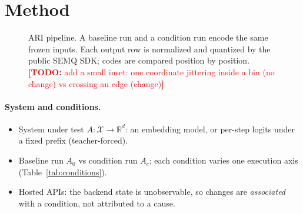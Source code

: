 \documentclass{article}
\newcommand{\todo}[1]{\textcolor{red}{\textbf{[TODO:} #1\textbf{]}}}
\begin{document}
\section{Method}\label{sec:method}

\begin{figure}[t]
\centering
{}
\caption{ARI pipeline. A baseline run and a condition run encode the same frozen inputs. Each output row is normalized and quantized by the public SEMQ SDK; codes are compared position by position. \todo{add a small inset: one coordinate jittering inside a bin (no change) vs crossing an edge (change)}}
\label{fig:pipeline}
\end{figure}

\paragraph{System and conditions.}
\begin{itemize}
  \item System under test $A:\mathcal X\to\mathbb R^d$: an embedding model, or per-step logits under a fixed prefix (teacher-forced).
  \item Baseline run $A_0$ vs condition run $A_c$; each condition varies one execution axis (Table~\ref{tab:conditions}).
  \item Hosted APIs: the backend state is unobservable, so changes are \emph{associated} with a condition, not attributed to a cause.
\end{itemize}
\end{document}
